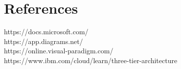 \section{References}
https://docs.microsoft.com/\\
https://app.diagrams.net/\\
https://online.visual-paradigm.com/\\
https://www.ibm.com/cloud/learn/three-tier-architecture\\